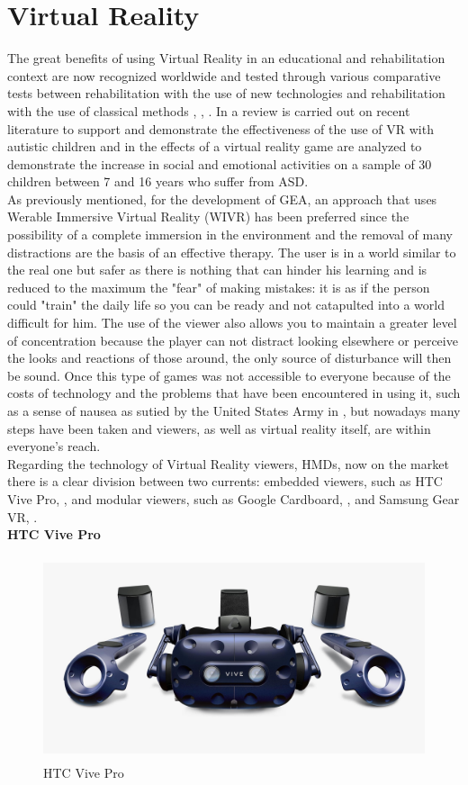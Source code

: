 \section{Virtual Reality}
The great benefits of using Virtual Reality in an educational and rehabilitation context are now recognized worldwide and tested through various comparative tests between rehabilitation with the use of new technologies and rehabilitation with the use of classical methods \cite{Parsons}, \cite{Reid}, \cite{Wii}. In \cite{Pelagia} a review is carried out on recent literature to support and demonstrate the effectiveness of the use of VR with autistic children and in \cite{Tandra} the effects of a virtual reality game are analyzed to demonstrate the increase in social and emotional activities on a sample of 30 children between 7 and 16 years who suffer from ASD.\\
As previously mentioned, for the development of GEA, an approach that uses Werable Immersive Virtual Reality (WIVR) has been preferred since the possibility of a complete immersion in the environment and the removal of many distractions are the basis of an effective therapy. The user is in a world similar to the real one but safer as there is nothing that can hinder his learning and is reduced to the maximum the "fear" of making mistakes: it is as if the person could "train" the daily life so you can be ready and not catapulted into a world difficult for him. The use of the viewer also allows you to maintain a greater level of concentration because the player can not distract looking elsewhere or perceive the looks and reactions of those around, the only source of disturbance will then be sound. Once this type of games was not accessible to everyone because of the costs of technology and the problems that have been encountered in using it, such as a sense of nausea as sutied by the United States Army in \cite{Eugenia}, but nowadays many steps have been taken and viewers, as well as virtual reality itself, are within everyone's reach.\\
Regarding the technology of Virtual Reality viewers, HMDs, now on the market there is a clear division between two currents: embedded viewers, such as HTC Vive Pro, \cite{Vive}, and modular viewers, such as Google Cardboard, \cite{Cardboard}, and Samsung Gear VR, \cite{Gear}.\\
\textbf{HTC Vive Pro}
\begin{figure}[H]
\centering
\includegraphics[width=12cm, height=6cm]{immagini/vive.jpg}
\caption{HTC Vive Pro}\label{fig:htcvive}
\end{figure}
